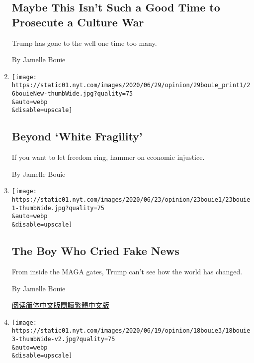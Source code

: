 \begin{enumerate}
  \hypertarget{maybe-this-isnt-such-a-good-time-to-prosecute-a-culture-war}{%
  \subsection{Maybe This Isn't Such a Good Time to Prosecute a Culture
  War}\label{maybe-this-isnt-such-a-good-time-to-prosecute-a-culture-war}}

  Trump has gone to the well one time too many.

  By Jamelle Bouie
\item
  \href{/2020/06/26/opinion/black-lives-matter-injustice.html}{}

  \texttt{[image: https://static01.nyt.com/images/2020/06/29/opinion/29bouie\_print1/26bouieNew-thumbWide.jpg?quality=75\\\&auto=webp\\\&disable=upscale]}

  \hypertarget{beyond-white-fragility}{%
  \subsection{Beyond `White Fragility'}\label{beyond-white-fragility}}

  If you want to let freedom ring, hammer on economic injustice.

  By Jamelle Bouie
\item
  \href{/2020/06/23/opinion/maga-trump-fake-news.html}{}

  \texttt{[image: https://static01.nyt.com/images/2020/06/23/opinion/23bouie1/23bouie1-thumbWide.jpg?quality=75\\\&auto=webp\\\&disable=upscale]}

  \hypertarget{the-boy-who-cried-fake-news}{%
  \subsection{The Boy Who Cried Fake
  News}\label{the-boy-who-cried-fake-news}}

  From inside the MAGA gates, Trump can't see how the world has changed.

  By Jamelle Bouie

  \href{https://cn.nytimes.com/opinion/20200624/maga-trump-fake-news/}{阅读简体中文版}\href{https://cn.nytimes.com/opinion/20200624/maga-trump-fake-news/zh-hant/}{閱讀繁體中文版}
\item
  \href{/2020/06/18/opinion/juneteenth-slavery-freedom.html}{}

  \texttt{[image: https://static01.nyt.com/images/2020/06/19/opinion/18bouie3/18bouie3-thumbWide-v2.jpg?quality=75\\\&auto=webp\\\&disable=upscale]}


\end{enumerate}
